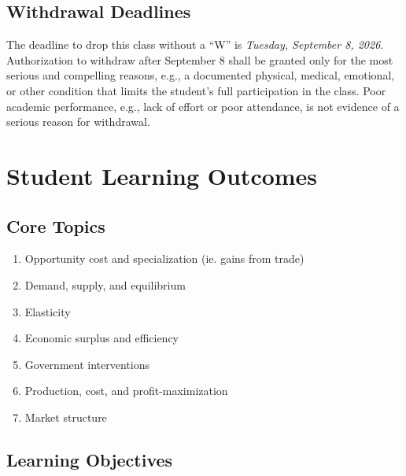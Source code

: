 \documentclass{syllabus}
\begin{document}
\subsection*{Withdrawal Deadlines}

The deadline to drop this class without a ``W'' is \textit{Tuesday, September 8, 2026}. Authorization to withdraw after September 8 shall be granted only for the most serious and compelling reasons, e.g., a documented physical, medical, emotional, or other condition that limits the student's full participation in the class. Poor academic performance, e.g., lack of effort or poor attendance, is not evidence of a serious reason for withdrawal.

\section*{Student Learning Outcomes}

\subsection*{Core Topics}
\begin{enumerate}
\itemsep0em
\item Opportunity cost and specialization (ie. gains from trade) 
\item Demand, supply, and equilibrium
\item Elasticity
\item Economic surplus and efficiency  
\item Government interventions
\item Production, cost, and profit-maximization
\item Market structure 
\end{enumerate}


\subsection*{Learning Objectives}
\end{document}
